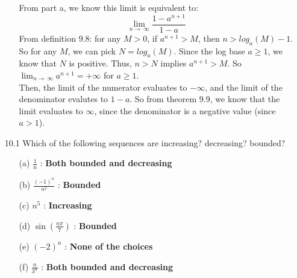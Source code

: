\begin{itemize}
\begin{itemize}
        From part a, we know this limit is equivalent to:
        $$\lim_{n \to\ \infty} \frac{1 - a^{n+1}}{1-a}$$
        From definition 9.8: for any $M > 0$, if $a^{n+1} > M$, then $n > log_a(M) - 1$. So for any $M$, we can pick $N = log_a(M)$. Since the log base $a \geq 1$, we know that $N$ is positive. Thus, $n > N$ implies $a^{n+1} > M$. So $\lim_{n \to\ \infty} a^{n+1} = + \infty$ for $a \geq 1$.\\

        Then, the limit of the numerator evaluates to $-\infty$, and the limit of the denominator evalutes to $1-a$. So from theorem 9.9, we know that the limit evaluates to $\infty$, since the denominator is a negative value (since $a > 1$).
    \end{itemize}
  \item [10.1]
    Which of the following sequences are increasing? decreasing? bounded?
    \begin{itemize}
      \item [(a)] $\frac{1}{n}$ : \textbf{Both bounded and decreasing}
      \item [(b)] $\frac{(-1)^n}{n^2}$ : \textbf{Bounded}
      \item [(c)] $n^5$ : \textbf{Increasing}
      \item [(d)] $\sin(\frac{n \pi}{7})$ : \textbf{Bounded}
      \item [(e)] $(-2)^n$ : \textbf{None of the choices}
      \item [(f)] $\frac{n}{3^n}$ : \textbf{Both bounded and decreasing}
    \end{itemize}
\end{itemize}


